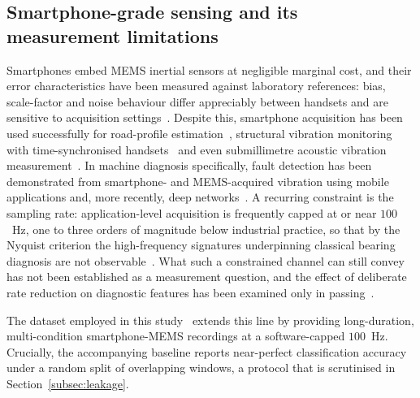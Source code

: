\subsection{Smartphone-grade sensing and its measurement limitations}
Smartphones embed MEMS inertial sensors at negligible marginal cost, and their
error characteristics have been measured against laboratory references: bias,
scale-factor and noise behaviour differ appreciably between handsets and are
sensitive to acquisition settings~\cite{capuano2023smartphone}. Despite this,
smartphone acquisition has been used successfully for road-profile
estimation~\cite{zhao2019smartphone}, structural vibration monitoring with
time-synchronised handsets~\cite{periyasamy2026smartphone} and even
submillimetre acoustic vibration measurement~\cite{yang2025smartphone}. In machine
diagnosis specifically, fault detection has been demonstrated from smartphone- and
MEMS-acquired vibration using mobile applications and, more recently, deep
networks~\cite{naha2017mobile, ertargin2023deep, ertargin2025automated}. A
recurring constraint is the sampling rate: application-level acquisition is
frequently capped at or near $100$~Hz, one to three orders of magnitude below
industrial practice, so that by the Nyquist criterion the high-frequency
signatures underpinning classical bearing diagnosis are not
observable~\cite{nyquist1924certain}. What such a constrained channel can still
convey has not been established as a measurement question, and the effect of
deliberate rate reduction on diagnostic features has been examined only in
passing~\cite{he2021sampling}.

The dataset employed in this study~\cite{ertargin2026smartphone,
ertargin2026dataset} extends this line by providing long-duration,
multi-condition smartphone-MEMS recordings at a software-capped $100$~Hz.
Crucially, the accompanying baseline reports near-perfect classification accuracy
under a random split of overlapping windows, a protocol that is scrutinised in
Section~\ref{subsec:leakage}.

